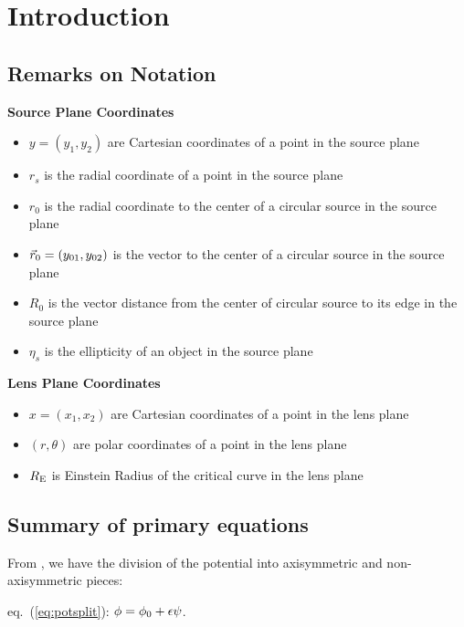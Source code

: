 \chapter{Introduction}

\section{Remarks on Notation}

{\bf Source Plane Coordinates}
\begin{itemize}
\item{ $ y = (y_1, y_2) $ are Cartesian coordinates of a point in the source plane}
\item{   $r_s $ is the radial coordinate of a point in the source plane}
\item{   $r_0 $ is the radial coordinate to the center of a circular source in the source plane}

\item{   $\vec{r}_0 =(y_{01},y_{02})$ is the vector to the center of a circular source in the source plane}

\item{ $R_0 $ is the vector distance from the center of circular
  source to its edge in the source plane}

\item{ $\eta_s$ is the ellipticity of an object in the source plane}

\end{itemize}

{\bf Lens Plane Coordinates}

\begin{itemize}
\item{ $ x = (x_1, x_2) $ are Cartesian coordinates of a point in the lens plane}
\item{ $  (r, \theta) $ are polar coordinates of a point in the lens plane}
\item{ $R_{\mathrm{E}}$ is Einstein Radius of the critical curve in the lens plane}
\end{itemize}



\section{Summary of primary equations}

From , we have the division of the potential into
axisymmetric and non-axisymmetric pieces:

eq.~(\ref{eq:potsplit}): $\phi  =  \phi_0 + \epsilon \psi$.

